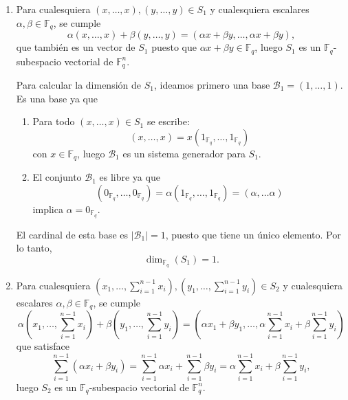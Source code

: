 \begin{enumerate}[label=\alph*)]
	\item Para cualesquiera $(x,\dots,x),(y,\dots,y)\in S_1$ y cualesquiera escalares $\alpha,\beta\in\mathbb{F}_q$, se cumple
	\[\alpha(x,\dots,x) + \beta(y,\dots,y) = (\alpha x + \beta y,\dots,\alpha x + \beta y),\]
	que también es un vector de $S_1$ puesto que $\alpha x + \beta y \in\mathbb{F}_q$, luego $S_1$ es un $\mathbb{F}_q$-subespacio vectorial de $\mathbb{F}_q^n$.
	
	Para calcular la dimensión de $S_1$, ideamos primero una base $\mathcal{B}_1 = (1,\dots,1)$. Es una base ya que
	\begin{enumerate}[label=\arabic*)]
		\item Para todo $(x,\dots,x)\in S_1$ se escribe:
		\[(x,\dots,x) = x(1_{\mathbb{F}_q},\dots,1_{\mathbb{F}_q})\]
		con $x\in\mathbb{F}_q$, luego $\mathcal{B}_1$ es un sistema generador para $S_1$.
		\item El conjunto $\mathcal{B}_1$ es libre ya que
		\[(0_{\mathbb{F}_q},\dots,0_{\mathbb{F}_q}) = \alpha(1_{\mathbb{F}_q},\dots,1_{\mathbb{F}_q}) = (\alpha,\dots\alpha)\]
		implica $\alpha=0_{\mathbb{F}_q}$.
	\end{enumerate}
	El cardinal de esta base es $|\mathcal{B}_1| = 1$, puesto que tiene un único elemento. Por lo tanto,
	\[\dim_{\mathbb{F}_q}(S_1) = 1.\]
	
	\item Para cualesquiera $(x_1,\dots,\sum_{i=1}^{n-1}x_i),(y_1,\dots,\sum_{i=1}^{n-1}y_i)\in S_2$ y cualesquiera escalares $\alpha,\beta\in\mathbb{F}_q$, se cumple
	\[\alpha(x_1,\dots,\sum_{i=1}^{n-1}x_i) + \beta(y_1,\dots,\sum_{i=1}^{n-1}y_i) = (\alpha x_1 + \beta y_1,\dots,\alpha \sum_{i=1}^{n-1}x_i + \beta \sum_{i=1}^{n-1}y_i)\]
	que satisface
	\[\sum_{i=1}^{n-1}(\alpha x_i + \beta y_i) = \sum_{i=1}^{n-1}\alpha x_i + \sum_{i=1}^{n-1}\beta y_i = \alpha \sum_{i=1}^{n-1}x_i + \beta \sum_{i=1}^{n-1}y_i,\]
	luego $S_2$ es un $\mathbb{F}_q$-subespacio vectorial de $\mathbb{F}_q^n$.
	

\end{enumerate}
